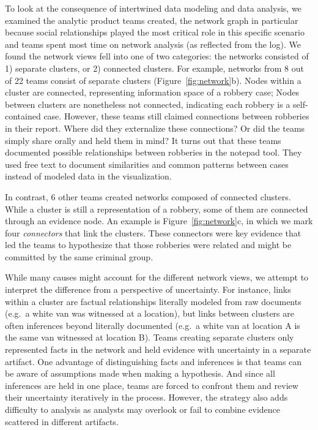 To look at the consequence of intertwined data modeling and data
analysis, we examined the analytic product teams created, the network
graph in particular because social relationships played the most
critical role in this specific scenario and teams spent most time on
network analysis (as reflected from the log). We found the network views
fell into one of two categories: the networks consisted of 1) separate
clusters, or 2) connected clusters. For example, networks from 8 out of 22 teams
consist of separate clusters (Figure~\ref{fig:network}b). Nodes within a cluster are connected,
representing information space of a robbery case; Nodes between clusters
are nonetheless not connected, indicating each robbery is a
self-contained case. However, these teams still claimed connections
between robberies in their report. Where did they externalize these
connections? Or did the teams simply share orally and held them in mind?
It turns out that these teams documented possible relationships between
robberies in the notepad tool. They used free text to document similarities and common patterns between cases instead of modeled data in the visualization.

In contrast, 6 other teams created networks
composed of connected clusters. While a cluster is still a
representation of a robbery, some of them are connected through an
evidence node. An example is Figure~\ref{fig:network}c, in which we
mark four \emph{connectors} that link the clusters. These connectors
were key evidence that led the teams to hypothesize that those robberies
were related and might be committed by the same criminal group.

While many causes might account for the different network views, we
attempt to interpret the difference from a perspective of uncertainty.
For instance, links within a cluster are factual relationships literally
modeled from raw documents (e.g.~a white van was witnessed at a
location), but links between clusters are often inferences beyond
literally documented (e.g.~a white van at location A is the same van
witnessed at location B). Teams creating separate clusters only
represented facts in the network and held evidence with uncertainty in a
separate artifact. One advantage of distinguishing facts and inferences
is that teams can be aware of assumptions made when making a hypothesis.
And since all inferences are held in one place, teams are forced to
confront them and review their uncertainty iteratively in the process.
However, the strategy also adds difficulty to analysis as analysts may
overlook or fail to combine evidence scattered in different artifacts.

